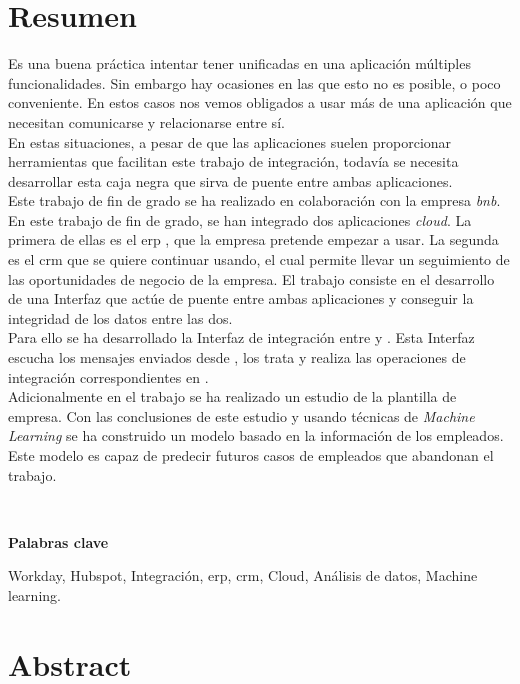 \chapter*{Resumen}
	
	Es una buena práctica intentar tener unificadas en una aplicación múltiples funcionalidades.
	Sin embargo hay ocasiones en las que esto no es posible, o poco conveniente.
	En estos casos nos vemos obligados a usar más de una aplicación que necesitan comunicarse y relacionarse entre sí.\\
	
	En estas situaciones, a pesar de que las aplicaciones suelen proporcionar herramientas que facilitan este trabajo de integración, todavía se necesita desarrollar esta
	caja negra que sirva de puente entre ambas aplicaciones.\\
	
	Este trabajo de fin de grado se ha realizado en colaboración con la empresa \textit{\acrfull{bnb}}.
	En este trabajo de fin de grado, se han integrado dos aplicaciones \textit{cloud}. La primera de ellas es el \acrfull{erp} \wday{}, que la empresa pretende empezar a usar.
	La segunda es el \acrfull{crm} \hs{} que se quiere continuar usando, el cual permite llevar un seguimiento de las oportunidades de negocio de la empresa.
	El trabajo consiste en el desarrollo de una Interfaz que actúe de puente entre ambas aplicaciones y conseguir la integridad de los datos entre las dos. \\
	
	
	Para ello se ha desarrollado la Interfaz de integración entre \hs{} y \wday{}. Esta Interfaz escucha los mensajes enviados desde \hs{}, los trata y realiza las operaciones de integración correspondientes en \wday{}.\\

	Adicionalmente en el trabajo se ha realizado un estudio de la plantilla de empresa.
	Con las conclusiones de este estudio y usando técnicas de \textit{Machine Learning} se ha construido
	un modelo basado en la información de los empleados. Este modelo es capaz de predecir futuros casos de empleados que abandonan el trabajo.
	

	\
	
	\textbf{Palabras clave}
    
    Workday, Hubspot, Integración, \acrfull{erp}, \acrfull{crm}, Cloud, Análisis de datos, Machine learning.


\chapter*{Abstract}
	
